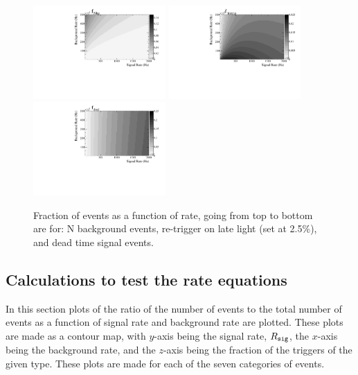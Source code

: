 \documentclass[twocolumn]{bmcart}
\begin{document}
\begin{backmatter}
\begin{figure}[!htpb]
\centering
\includegraphics[width=0.45\textwidth]{figures/tfNbg.pdf}
\includegraphics[width=0.45\textwidth]{figures/tf1retrig.pdf}
\includegraphics[width=0.45\textwidth]{figures/tfdead.pdf}

\caption{ Fraction of events as a function of rate, going from top to
  bottom are for: N background events, re-trigger on late light (set
  at 2.5\%), and dead time signal events.  }\label{fig:fracs2}
\end{figure}


\subsection{Calculations to test the rate equations}

In this section plots of the ratio of the number of events to the
total number of events as a function of signal rate and background
rate are plotted.  These plots are made as a contour map, with
$y$-axis being the signal rate, $R_{\tt sig}$, the $x$-axis being the
background rate, and the $z$-axis being the fraction of the triggers
of the given type.  These plots are made for each of the seven
categories of events.


\end{backmatter}
\end{document}
